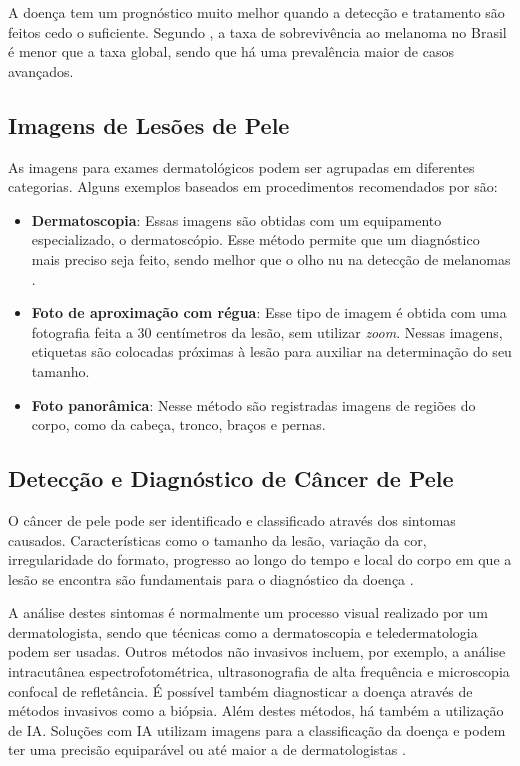 A doença tem um prognóstico muito melhor quando a detecção e tratamento são feitos cedo o suficiente. Segundo \textcite{skin_cancer_survival}, a taxa de sobrevivência ao
melanoma no Brasil é menor que a taxa global, sendo que há uma prevalência maior de casos avançados.

\subsection{Imagens de Lesões de Pele}

As imagens para exames dermatológicos podem ser agrupadas em diferentes categorias. Alguns exemplos baseados em procedimentos recomendados por
\textcite{fotos_dermatologia} são:


\begin{itemize}
      \item \textbf{Dermatoscopia}: Essas imagens são obtidas com um equipamento especializado, o dermatoscópio. Esse método permite que um diagnóstico mais preciso seja
            feito, sendo melhor que o olho nu na detecção de melanomas \cite{dermatoscopy}.
      \item \textbf{Foto de aproximação com régua}: Esse tipo de imagem é obtida com uma fotografia feita a 30 centímetros da lesão, sem utilizar \textit{zoom}.
            Nessas imagens, etiquetas são colocadas próximas à lesão para auxiliar na determinação do seu tamanho.
      \item \textbf{Foto panorâmica}: Nesse método são registradas imagens de regiões do corpo, como da cabeça, tronco, braços e pernas.
\end{itemize}

\subsection{Detecção e Diagnóstico de Câncer de Pele}

O câncer de pele pode ser identificado e classificado através dos sintomas causados. Características como o tamanho da lesão, variação da cor, irregularidade do formato,
progresso ao longo do tempo e local do corpo em que a lesão se encontra são fundamentais para o diagnóstico da doença \cite{recognizing_skin_cancer}.

A análise destes sintomas é normalmente um processo visual realizado por um dermatologista, sendo que técnicas como a dermatoscopia e teledermatologia podem ser usadas.
Outros métodos não invasivos incluem, por exemplo, a análise intracutânea espectrofotométrica, ultrasonografia de alta frequência e microscopia confocal de refletância.
É possível também diagnosticar a doença através de métodos invasivos como a biópsia. Além destes métodos, há também a utilização de \ac{IA}. Soluções com \ac{IA}
utilizam imagens para a classificação da doença e podem ter uma precisão equiparável ou até maior a de dermatologistas \cite{recognizing_skin_cancer, skin_cancer_ai}.

